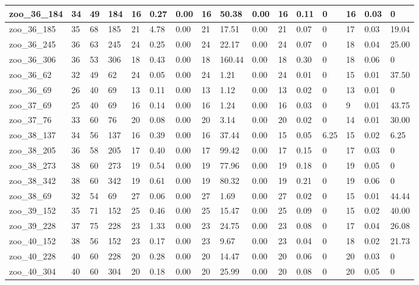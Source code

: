 \begin{landscape}
\begin{longtable}{llllllllllllllll}
zoo\_36\_184 & 34 & 49 & 184 & 16 & 0.27 & 0.00 & 16 & 50.38 & 0.00 & 16 & 0.11 & 0 & 16 & 0.03 & 0 \\ \hline 
zoo\_36\_185 & 35 & 68 & 185 & 21 & 4.78 & 0.00 & 21 & 17.51 & 0.00 & 21 & 0.07 & 0 & 17 & 0.03 & 19.04 \\ \hline 
zoo\_36\_245 & 36 & 63 & 245 & 24 & 0.25 & 0.00 & 24 & 22.17 & 0.00 & 24 & 0.07 & 0 & 18 & 0.04 & 25.00 \\ \hline 
zoo\_36\_306 & 36 & 53 & 306 & 18 & 0.43 & 0.00 & 18 & 160.44 & 0.00 & 18 & 0.30 & 0 & 18 & 0.06 & 0 \\ \hline 
zoo\_36\_62 & 32 & 49 & 62 & 24 & 0.05 & 0.00 & 24 & 1.21 & 0.00 & 24 & 0.01 & 0 & 15 & 0.01 & 37.50 \\ \hline 
zoo\_36\_69 & 26 & 40 & 69 & 13 & 0.11 & 0.00 & 13 & 1.12 & 0.00 & 13 & 0.02 & 0 & 13 & 0.01 & 0 \\ \hline 
zoo\_37\_69 & 25 & 40 & 69 & 16 & 0.14 & 0.00 & 16 & 1.24 & 0.00 & 16 & 0.03 & 0 & 9 & 0.01 & 43.75 \\ \hline 
zoo\_37\_76 & 33 & 60 & 76 & 20 & 0.08 & 0.00 & 20 & 3.14 & 0.00 & 20 & 0.02 & 0 & 14 & 0.01 & 30.00 \\ \hline 
zoo\_38\_137 & 34 & 56 & 137 & 16 & 0.39 & 0.00 & 16 & 37.44 & 0.00 & 15 & 0.05 & 6.25 & 15 & 0.02 & 6.25 \\ \hline 
zoo\_38\_205 & 36 & 58 & 205 & 17 & 0.40 & 0.00 & 17 & 99.42 & 0.00 & 17 & 0.15 & 0 & 17 & 0.03 & 0 \\ \hline 
zoo\_38\_273 & 38 & 60 & 273 & 19 & 0.54 & 0.00 & 19 & 77.96 & 0.00 & 19 & 0.18 & 0 & 19 & 0.05 & 0 \\ \hline 
zoo\_38\_342 & 38 & 60 & 342 & 19 & 0.61 & 0.00 & 19 & 80.32 & 0.00 & 19 & 0.21 & 0 & 19 & 0.06 & 0 \\ \hline 
zoo\_38\_69 & 32 & 54 & 69 & 27 & 0.06 & 0.00 & 27 & 1.69 & 0.00 & 27 & 0.02 & 0 & 15 & 0.01 & 44.44 \\ \hline 
zoo\_39\_152 & 35 & 71 & 152 & 25 & 0.46 & 0.00 & 25 & 15.47 & 0.00 & 25 & 0.09 & 0 & 15 & 0.02 & 40.00 \\ \hline 
zoo\_39\_228 & 37 & 75 & 228 & 23 & 1.33 & 0.00 & 23 & 24.75 & 0.00 & 23 & 0.08 & 0 & 17 & 0.04 & 26.08 \\ \hline 
zoo\_40\_152 & 38 & 56 & 152 & 23 & 0.17 & 0.00 & 23 & 9.67 & 0.00 & 23 & 0.04 & 0 & 18 & 0.02 & 21.73 \\ \hline 
zoo\_40\_228 & 40 & 60 & 228 & 20 & 0.28 & 0.00 & 20 & 14.47 & 0.00 & 20 & 0.06 & 0 & 20 & 0.03 & 0 \\ \hline 
zoo\_40\_304 & 40 & 60 & 304 & 20 & 0.18 & 0.00 & 20 & 25.99 & 0.00 & 20 & 0.08 & 0 & 20 & 0.05 & 0 \\ \hline 

\end{longtable}
\end{landscape}
